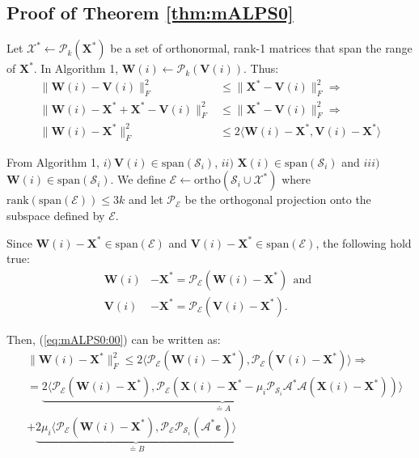 \documentclass[twocolumn]{svjour3}
\newcommand{\vectornormbig}[1]{\big\|#1\big\|}
\newcommand{\sensing}{\boldsymbol{\mathcal{A}}}
\newcommand{\signal}{\boldsymbol{X}}
\newcommand{\bestsignal}{\boldsymbol{X}^\ast}
\newcommand{\noise}{\boldsymbol{\varepsilon}}
\newcommand{\rank}{k}
\begin{document}
\subsection{Proof of Theorem \ref{thm:mALPS0}}

Let $ \mathcal{X}^\ast \leftarrow \mathcal{P}_{\rank}(\bestsignal) $ be a set of orthonormal, rank-1 matrices that span the range of $ \bestsignal $. In Algorithm 1, $ \boldsymbol{W}(i) \leftarrow \mathcal{P}_{\rank}(\boldsymbol{V}(i)) $. Thus:
\begin{align}
\vectornormbig{\boldsymbol{W}(i) - \boldsymbol{V}(i)}_F^2 &\leq \vectornormbig{\bestsignal - \boldsymbol{V}(i)}_F^2 \Rightarrow \nonumber \\
\vectornormbig{\boldsymbol{W}(i) - \bestsignal + \bestsignal - \boldsymbol{V}(i)}_F^2 &\leq \vectornormbig{\bestsignal - \boldsymbol{V}(i)}_F^2 \Rightarrow \nonumber \\
\vectornormbig{\boldsymbol{W}(i) - \bestsignal}_F^2 &\leq 2\langle \boldsymbol{W}(i) - \bestsignal, \boldsymbol{V}(i) - \bestsignal \rangle \label{eq:mALPS0:00}
\end{align}

From Algorithm 1, $ i) ~\boldsymbol{V}(i) \in \text{span}(\mathcal{S}_i) $, $ ii) $ $ \signal(i) \in \text{span}( \mathcal{S}_i) $ and $ iii) $ $ \boldsymbol{W}(i) \in \text{span}(\mathcal{S}_i) $. We define $ \mathcal{E} \leftarrow \text{ortho}(\mathcal{S}_i \cup \mathcal{X}^{\ast}) $ where $ \text{rank}(\text{span}(\mathcal{E})) \leq 3\rank $ and let $ \mathcal{P}_{\mathcal{E}} $ be the orthogonal projection onto the subspace defined by $ \mathcal{E} $. 

Since $ \boldsymbol{W}(i) - \bestsignal \in \text{span}(\mathcal{E}) $ and $ \boldsymbol{V}(i) - \bestsignal \in \text{span}(\mathcal{E}) $, the following hold true:
\begin{align}
\boldsymbol{W}(i) &- \bestsignal = \mathcal{P}_{\mathcal{E}} (\boldsymbol{W}(i) - \bestsignal)~~\text{and}~~ \nonumber \\ \boldsymbol{V}(i) &- \bestsignal = \mathcal{P}_{\mathcal{E}} (\boldsymbol{V}(i) - \bestsignal). \nonumber
\end{align}

Then, (\ref{eq:mALPS0:00}) can be written as:
\begin{align}
&\vectornormbig{\boldsymbol{W}(i) - \bestsignal}_F^2 \leq 2\langle \mathcal{P}_{\mathcal{E}}(\boldsymbol{W}(i) - \bestsignal), \mathcal{P}_{\mathcal{E}}(\boldsymbol{V}(i) - \bestsignal) \rangle \Rightarrow \nonumber \\
&= \underbrace{2\langle \mathcal{P}_{\mathcal{E}}(\boldsymbol{W}(i) - \bestsignal), \mathcal{P}_{\mathcal{E}}(\signal(i) - \bestsignal - \mu_i \mathcal{P}_{\mathcal{S}_i}\sensing^\ast \sensing (\signal(i) - \bestsignal)) \rangle}_{\doteq A} \nonumber \\ &+ \underbrace{2\mu_i\langle \mathcal{P}_{\mathcal{E}}(\boldsymbol{W}(i) - \bestsignal), \mathcal{P}_{\mathcal{E}}\mathcal{P}_{\mathcal{S}_i}(\sensing^\ast \noise) \rangle}_{\doteq B}  \label{eq:mALPS0:01}
\end{align}
\end{document}
